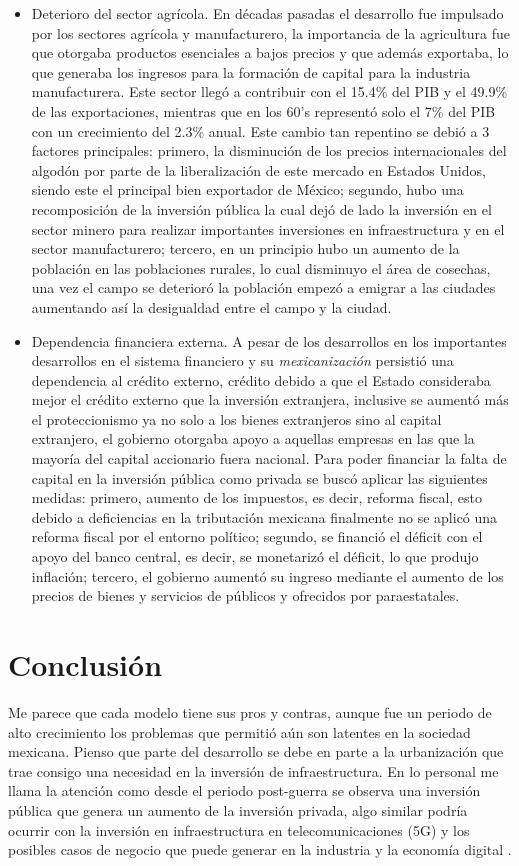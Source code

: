 \begin{itemize}
    \item Deterioro del sector agrícola. En décadas pasadas el desarrollo fue impulsado por los sectores agrícola y manufacturero, la importancia de la agricultura fue que otorgaba productos esenciales a bajos precios y que además exportaba, lo que generaba los ingresos para la formación de capital para la industria manufacturera. Este sector llegó a contribuir con el 15.4\% del PIB y el 49.9\% de las exportaciones, mientras que en los 60's representó solo el 7\% del PIB con un crecimiento del 2.3\% anual. Este cambio tan repentino se debió a 3 factores principales: primero, la disminución de los precios internacionales del algodón por parte de la liberalización de este mercado en Estados Unidos, siendo este el principal bien exportador de México; segundo, hubo una recomposición de la inversión pública la cual dejó de lado la inversión en el sector minero para realizar importantes inversiones en infraestructura y en el sector manufacturero; tercero, en un principio hubo un aumento de la población en las poblaciones rurales, lo cual disminuyo el área de cosechas, una vez el campo se deterioró la población empezó a emigrar a las ciudades aumentando así la desigualdad entre el campo y la ciudad.
    \item Dependencia financiera externa. A pesar de los desarrollos en los importantes desarrollos en el sistema financiero y su \textit{mexicanización} persistió una dependencia al crédito externo, crédito debido a que el Estado consideraba mejor el crédito externo que la inversión extranjera, inclusive se aumentó más el proteccionismo ya no solo a los bienes extranjeros sino al capital extranjero, el gobierno otorgaba apoyo a aquellas empresas en las que la mayoría del capital accionario fuera nacional. Para poder financiar la falta de capital en la inversión pública como privada se buscó aplicar las siguientes medidas: primero, aumento de los impuestos, es decir, reforma fiscal, esto debido a deficiencias en la tributación mexicana finalmente no se aplicó una reforma fiscal por el entorno político; segundo, se financió el déficit con el apoyo del banco central, es decir, se monetarizó el déficit, lo que produjo inflación; tercero, el gobierno aumentó su ingreso mediante el aumento de los precios de bienes y servicios de públicos y ofrecidos por paraestatales.
\end{itemize}

\section{Conclusión}
Me parece que cada modelo tiene sus pros y contras, aunque fue un periodo de alto crecimiento los problemas que permitió aún son latentes en la sociedad mexicana. Pienso que parte del desarrollo se debe en parte a la urbanización que trae consigo una necesidad en la inversión de infraestructura. En lo personal me llama la atención como desde el periodo post-guerra se observa una inversión pública que genera un aumento de la inversión privada, algo similar podría ocurrir con la inversión en infraestructura en telecomunicaciones (5G) y los posibles casos de negocio que puede generar en la industria y la economía digital \cite{DebilidadEstructural}.